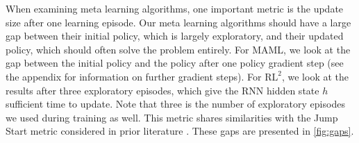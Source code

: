 \documentclass{article} %
\begin{document}
When examining meta learning algorithms, one important metric is the update size after one learning episode. Our meta learning algorithms should have a large gap between their initial policy, which is largely exploratory, and their updated policy, which should often solve the problem entirely. For MAML, we look at the gap between the initial policy and the policy after one policy gradient step (see the appendix for information on further gradient steps). For $\text{RL}^2$, we look at the results after three exploratory episodes, which give the RNN hidden state $h$ sufficient time to update. Note that three is the number of exploratory episodes we used during training as well. This metric shares similarities with the Jump Start metric considered in prior literature \cite{tlrev}. These gaps are presented in \ref{fig:gaps}. 
\end{document}
